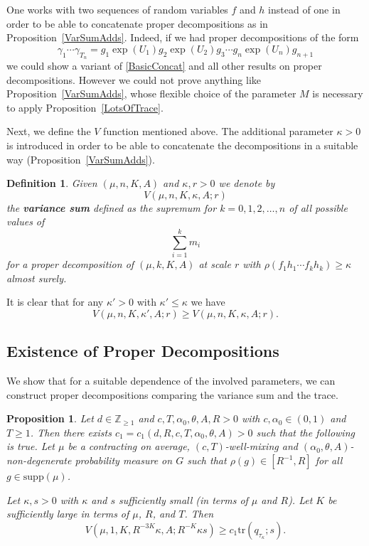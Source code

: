 \documentclass[10pt, english,oneside,reqno]{amsart}
\theoremstyle{plain}
\newtheorem{definition}[theorem]{Definition}
\newtheorem{proposition}[theorem]{Proposition}
\theoremstyle{remark}
\numberwithin{equation}{section}
\numberwithin{figure}{section}
\newcommand{\Z}{\mathbb{Z}}
\begin{document}
One works with two sequences of random variables $f$ and $h$ instead of one in order to be able to concatenate proper decompositions as in Proposition~\ref{VarSumAdds}. Indeed, if we had proper decompositions of the form $$\gamma_1\cdots \gamma_{T_n} = g_1\exp(U_1)g_2 \exp(U_2)g_3 \cdots g_{n}\exp(U_n)g_{n + 1}$$ we could show a variant of \eqref{BasicConcat} and all other results on proper decompositions. However we could not prove anything like Proposition~\ref{VarSumAdds}, whose flexible choice of the parameter $M$ is necessary to apply Proposition~\ref{LotsOfTrace}. 

Next, we define the $V$ function mentioned above. The additional parameter $\kappa > 0$ is introduced in order to be able to concatenate the decompositions in a suitable way (Proposition~\ref{VarSumAdds}).


\begin{definition}\label{VDef}
    Given $(\mu,n,K,A)$ and $\kappa,r > 0$ we denote by $$V(\mu,n,K, \kappa ,A; r)$$ the \textbf{variance sum} defined as the supremum for $k = 0,1,2, \ldots , n$ of all possible values of $$\sum_{i = 1}^k m_i$$ for a proper decomposition of $(\mu,k,K,A)$ at scale $r$ with $\rho(f_1h_1 \cdots f_k h_k) \geq \kappa$ almost surely. 
\end{definition}

It is clear that for any $\kappa' > 0$ with $\kappa' \leq \kappa$ we have 
\begin{equation}\label{TrivialVarianceBound}
    V(\mu,n,K, \kappa' ,A; r) \geq V(\mu,n,K, \kappa ,A; r).
\end{equation}

\subsection{Existence of Proper Decompositions}\label{section:ExistenceProper}


We show that for a suitable dependence of the involved parameters, we can construct proper decompositions comparing the variance sum and the trace.

\begin{proposition} \label{InitialDecompositionV}
    Let $d \in \Z_{\geq 1}$ and $c, T, \alpha_0, \theta, A, R > 0$ with $c, \alpha_0 \in (0,1)$ and $T \geq 1$. Then there exists $c_1 = c_1(d,R,c, T,\alpha_0,\theta, A) > 0$ such that the following is true. Let $\mu$ be a contracting on average, $(c, T)$-well-mixing and $(\alpha_0, \theta, A)$-non-degenerate probability measure on $G$ such that $\rho(g) \in [R^{-1}, R]$ for all $g \in \mathrm{supp}(\mu)$. 
    
    Let $\kappa, s > 0$ with $\kappa$ and $s$ sufficiently small (in terms of $\mu$ and $R$). Let $K$ be sufficiently large in terms of $\mu$, $R$, and $T$. Then $$V(\mu,1,K,R^{-3K} \kappa, A ; R^{-K} \kappa s) \geq c_1 \mathrm{tr}(q_{\tau_{\kappa}}; s). $$
\end{proposition}
\end{document}
